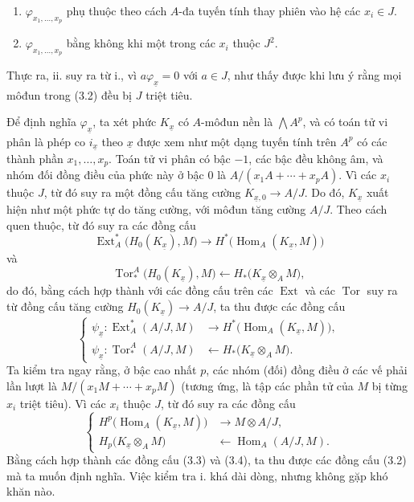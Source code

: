 \begin{enumerate}
\item[\textup{i.}] $\varphi_{x_1,\ldots,x_p}$ phụ thuộc theo cách
$A$-đa tuyến tính thay phiên vào hệ các $x_i\in J$.
\item[\textup{ii.}] $\varphi_{x_1,\ldots,x_p}$ bằng không khi một trong các $x_i$ thuộc
$J^{2}$.
\end{enumerate}
Thực ra, ii. suy ra từ i., vì $a\varphi_{\underline{x}}=0$ với $a\in J$,
như thấy được khi lưu ý rằng mọi môđun trong (3.2) đều bị
$J$ triệt tiêu.

Để định nghĩa $\varphi_{\underline{x}}$, ta xét phức
$K_{\underline{x}}$ có $A$-môđun nền là $\bigwedge A^{p}$, và
có toán tử vi phân là phép co $i_{\underline{x}}$ theo
$\underline{x}$ được xem như một dạng tuyến tính trên $A^{p}$ có các thành phần
$x_1,\ldots,x_p$. Toán tử vi phân có bậc $-1$, các bậc đều
không âm, và nhóm đối đồng điều của phức này ở bậc $0$ là
$A/(x_1A+\cdots+x_pA)$. Vì các $x_i$ thuộc $J$, từ đó suy ra một
đồng cấu tăng cường $K_{\underline{x},0}\longrightarrow A/J$. Do đó,
$K_{\underline{x}}$ xuất hiện như một phức tự do tăng cường, với môđun
tăng cường $A/J$. Theo cách quen thuộc, từ đó suy ra các đồng cấu
\[
\operatorname{Ext}_{A}^{*}\bigl(H_0(K_{\underline{x}}),M\bigr)
\longrightarrow
H^{*}\bigl(\operatorname{Hom}_{A}(K_{\underline{x}},M)\bigr)
\]
và
\[
\operatorname{Tor}_{*}^{A}\bigl(H_0(K_{\underline{x}}),M\bigr)
\longleftarrow
H_{*}\bigl(K_{\underline{x}}\otimes_A M\bigr),
\]
do đó, bằng cách hợp thành với các đồng cấu trên các $\operatorname{Ext}$ và các
$\operatorname{Tor}$ suy ra từ đồng cấu tăng cường
$H_0(K_{\underline{x}})\longrightarrow A/J$, ta thu được các đồng cấu
\begin{equation}\tag{3.3}
\left\{
\begin{aligned}
\psi_{\underline{x}}:
\operatorname{Ext}_{A}^{*}(A/J,M)
&\longrightarrow H^{*}\bigl(\operatorname{Hom}_{A}(K_{\underline{x}},M)\bigr),\\
\psi_{\underline{x}}:
\operatorname{Tor}_{*}^{A}(A/J,M)
&\longleftarrow H_{*}\bigl(K_{\underline{x}}\otimes_A M\bigr).
\end{aligned}
\right.
\end{equation}
Ta kiểm tra ngay rằng, ở bậc cao nhất $p$, các nhóm (đối) đồng điều ở các vế
phải lần lượt là $M/(x_1M+\cdots+x_pM)$ (tương ứng, là tập các phần tử của $M$
bị từng $x_i$ triệt tiêu). Vì các $x_i$ thuộc $J$, từ đó suy ra các
đồng cấu
\begin{equation}\tag{3.4}
\left\{
\begin{aligned}
H^{p}\bigl(\operatorname{Hom}_{A}(K_{\underline{x}},M)\bigr)
&\longrightarrow M\otimes A/J,\\
H_{p}\bigl(K_{\underline{x}}\otimes_A M\bigr)
&\longleftarrow\operatorname{Hom}_{A}(A/J,M).
\end{aligned}
\right.
\end{equation}
Bằng cách hợp thành các đồng cấu (3.3) và (3.4), ta thu được các đồng cấu (3.2)
mà ta muốn định nghĩa. Việc kiểm tra i. khá dài dòng, nhưng không
gặp khó khăn nào.


